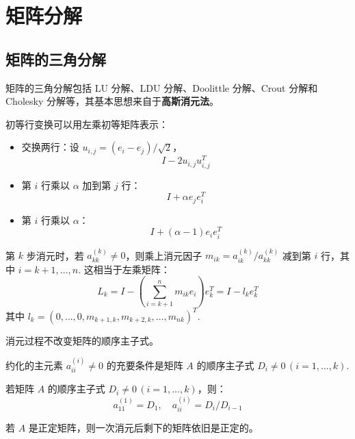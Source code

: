 \section{矩阵分解}

\subsection{矩阵的三角分解}

矩阵的三角分解包括 LU 分解、LDU 分解、Doolittle 分解、Crout 分解和 Cholesky 分解等，其基本思想来自于\textbf{高斯消元法}。

\begin{definition}[初等矩阵]
初等行变换可以用左乘初等矩阵表示：
\begin{itemize}
    \item 交换两行：设 $u_{i,j}=(e_i-e_j)/\sqrt{2}$，
    \[
        I-2u_{i,j}u_{i,j}^T
    \]

    \item 第 $i$ 行乘以 $\alpha$ 加到第 $j$ 行：
    \[
        I+\alpha e_je_i^T
    \]

    \item 第 $i$ 行乘以 $\alpha$：
    \[
        I+(\alpha-1)e_ie_i^T
    \]
\end{itemize}
\end{definition}

\begin{definition}[消元因子]
第 $k$ 步消元时，若 $a_{kk}^{(k)}\neq 0$，则乘上消元因子 $m_{ik}=a_{ik}^{(k)}/a_{kk}^{(k)}$ 减到第 $i$ 行，其中 $i=k+1,\ldots,n$. 这相当于左乘矩阵： 
\[
    L_k=I-\left(\sum_{i=k+1}^nm_{ik}e_i\right)e_k^T=I-l_ke_k^T
\]
其中 $l_k=(0,\ldots,0,m_{k+1,k},m_{k+2,k},\ldots,m_{nk})^T$.
\end{definition}

\begin{theorem}
消元过程不改变矩阵的顺序主子式。
\end{theorem}

\begin{lemma}
约化的主元素 $a_{ii}^{(i)}\neq 0$ 的充要条件是矩阵 $A$ 的顺序主子式 $D_i\neq 0\,(i=1,\ldots,k)$.
\end{lemma}

\begin{corollary}
若矩阵 $A$ 的顺序主子式 $D_i\neq 0\,(i=1,\ldots,k)$，则：
\[
    a_{11}^{(1)}=D_1,\quad a_{ii}^{(i)}=D_i/D_{i-1}
\]
\end{corollary}

\begin{theorem}
若 $A$ 是正定矩阵，则一次消元后剩下的矩阵依旧是正定的。
\end{theorem}

